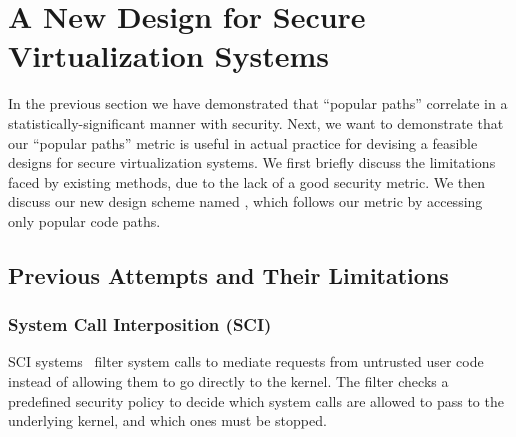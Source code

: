 \section{A New Design for Secure Virtualization Systems}
\label{sec.design}


In the previous section we have demonstrated that ``popular paths'' correlate in
a statistically-significant manner with security.
Next, we want to demonstrate that our ``popular paths'' metric is useful in
actual practice for devising a feasible designs for
secure virtualization systems. We first briefly discuss the limitations faced
by existing methods, due to the lack of a good
security metric. We then discuss our new design scheme named \lip, which follows
our metric by accessing only popular code paths.

\subsection{Previous Attempts and Their Limitations}

\subsubsection{System Call Interposition (SCI)}
SCI systems~\cite{Janus0:96, Janus:99} filter system calls to mediate requests
from untrusted user code instead of allowing them to go directly to the kernel.
The filter checks a predefined security policy to decide which system calls are
allowed to pass to the underlying kernel, and which ones must be stopped.

